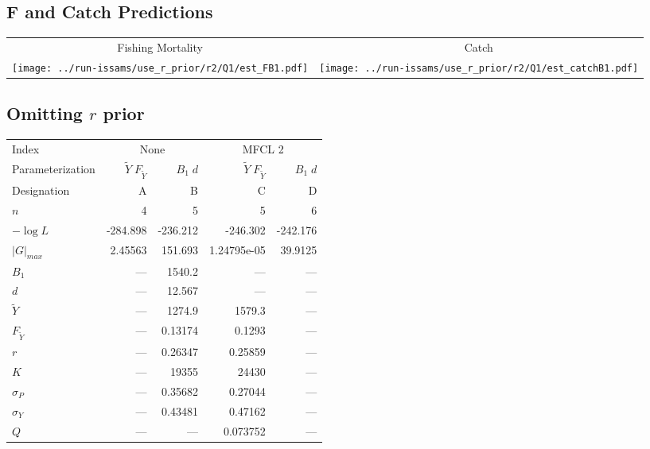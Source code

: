 \documentclass[letterpaper,KOMA,landscape,titlepage]{powersem}
\newcommand\MSY{\widetilde{Y}}
\newcommand\Fmsy{F_{\MSY}}
\newcommand\MSYFmsy{\MSY\;\Fmsy}
\newcommand\Bd{B_1\; d}
\begin{document}
\begin{slide}\section{F and Catch Predictions}
\begin{center}
\begin{tabular}{cc}
Fishing Mortality & Catch\\
\texttt{[image: ../run-issams/use\_r\_prior/r2/Q1/est\_FB1.pdf]}
&
\texttt{[image: ../run-issams/use\_r\_prior/r2/Q1/est\_catchB1.pdf]}\\
\end{tabular}

\end{center}
\end{slide}

\begin{slide}\section{Omitting $r$ prior}
\label{tag:ests4NOprior}
{\scriptsize
\begin{center}
\begin{tabular}{|l|rr|rr|}
\hline
Index & \multicolumn{2}{c|}{None}&\multicolumn{2}{c|}{MFCL 2}\\
\cline{2-3}\cline{4-5}
Parameterization&$\MSYFmsy$&$\Bd$&$\MSYFmsy$&$\Bd$\\
Designation& A & B& C& D\\
\hline
\hline
$n$ & 4 & 5 & 5 & 6\\
$-\log L$ & -284.898 & -236.212 & -246.302 & -242.176\\
$|G|_{max}$ & 2.45563 & 151.693 & 1.24795e-05 & 39.9125\\
\hline
$B_1$ & --- & 1540.2 & --- & ---\\
$d$ & --- & 12.567 & --- & ---\\
$\MSY$ & --- & 1274.9 & 1579.3 & ---\\
$\Fmsy$ & --- & 0.13174 & 0.1293 & ---\\
$r$ & --- & 0.26347 & 0.25859 & ---\\
$K$ & --- & 19355 & 24430 & ---\\
$\sigma_P$ & --- & 0.35682 & 0.27044 & ---\\
$\sigma_Y$ & --- & 0.43481 & 0.47162 & ---\\
$Q$ & --- & --- & 0.073752 & ---\\
\hline
\end{tabular}
\end{center} }
\end{slide}
\end{document}
